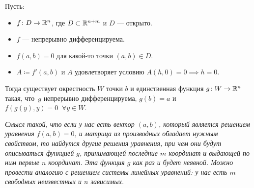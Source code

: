 \begin{theorem} 
    Пусть:
    \begin{itemize}
      \item $f \colon D \to \mathbb{R}^n$, где $D \subset \mathbb{R}^{n + m}$ и $D$ --- открыто.
      \item $f$ --- непрерывно дифференцируема.
      \item $f(a, b) = 0$ для какой-то точки $(a, b) \in D$.
      \item $A \coloneqq f'(a, b)$ и $A$ удовлетворяет условию $A(h, 0) = 0 \implies h = 0$.
    \end{itemize}
    Тогда существует окрестность $W$ точки $b$ и единственная функция $g\colon W \to \mathbb{R}^n$ такая, что~$g$ непрерывно дифференцируема, $g(b) = a$ и $f(g(y), y) = 0\;\; \forall y \in W$. 
    

    \textit{Смысл такой, что если у нас есть вектор $(a, b)$, который является решением уравнения $f(a, b) = 0$, и матрица из производных обладает нужным свойством, то найдутся другие решения уравнения, 
    при чем они будут описываться функцией $g$, принимающей последние $m$ координат и выдающей по ним первые $n$ координат.
    Эта функция $g$ как раз и будет неявной.
    Можно провести аналогию с решением системы линейных уравнений: 
    у нас есть $m$ свободных неизвестных и $n$ зависимых.}
\end{theorem}
